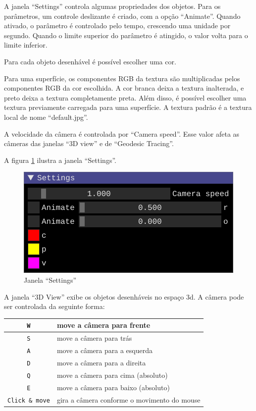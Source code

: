 A janela ``Settings'' controla algumas propriedades dos objetos.
Para os parâmetros, um controle deslizante é criado, com a opção ``Animate''.
Quando ativado, o parâmetro é controlado pelo tempo,
crescendo uma unidade por segundo.
Quando o limite superior do parâmetro é atingido,
o valor volta para o limite inferior.

Para cada objeto desenhável é possível escolher uma cor.

Para uma superfície, os componentes RGB da textura
são multiplicadas pelos componentes RGB da cor escolhida.
A cor branca deixa a textura inalterada,
e preto deixa a textura completamente preta.
Além disso, é possível escolher uma textura previamente carregada para
uma superfície. A textura padrão é a textura local de nome ``default.jpg''.

A velocidade da câmera é controlada por ``Camera speed''.
Esse valor afeta as câmeras das janelas ``3D view'' e de ``Geodesic Tracing''.

A figura \ref{img:settings} ilustra a janela ``Settings''.

\begin{figure}[!ht]
    \includegraphics[width=\linewidth]{settings.png}
    \caption{Janela ``Settings''}
    \label{img:settings}
\end{figure}

A janela ``3D View'' exibe os objetos desenháveis no espaço 3d.
A câmera pode ser controlada da seguinte forma:

\begin{centering}
\begin{tabularx}{\textwidth}{||c|X||}
    \hline
    \texttt{W} & move a câmera para frente \\
    \hline
    \texttt{S} & move a câmera para trás \\
    \hline
    \texttt{A} & move a câmera para a esquerda \\
    \hline
    \texttt{D} & move a câmera para a direita \\
    \hline
    \texttt{Q} & move a câmera para cima (absoluto) \\
    \hline
    \texttt{E} & move a câmera para baixo (absoluto) \\
    \hline
    \texttt{Click \& move} & gira a câmera conforme o movimento do mouse \\
    \hline
\end{tabularx}
\end{centering}

